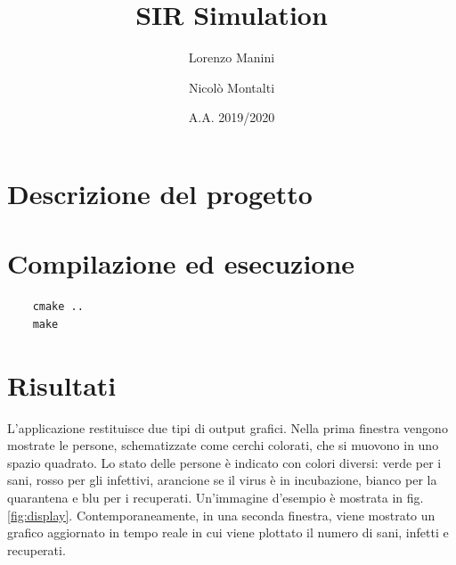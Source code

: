 \documentclass[a4paper,10pt,twocolumn]{article}
\begin{document}
\title{SIR Simulation}
\author{Lorenzo Manini \and Nicolò Montalti}
\date{A.A. 2019/2020}

\maketitle

\section{Descrizione del progetto}
\section{Compilazione ed esecuzione}

\begin{verbatim}
    cmake ..
    make
\end{verbatim}

\section{Risultati}
L'applicazione restituisce due tipi di output grafici. Nella prima finestra vengono mostrate le persone, schematizzate come cerchi colorati, che si muovono in uno spazio quadrato. Lo stato delle persone è indicato con colori diversi: verde per i sani, rosso per gli infettivi, arancione se il virus è in incubazione, bianco per la quarantena e blu per i recuperati. Un'immagine d'esempio è mostrata in fig. \ref{fig:display}. Contemporaneamente, in una seconda finestra, viene mostrato un grafico aggiornato in tempo reale in cui viene plottato il numero di sani, infetti e recuperati.
\end{document}
